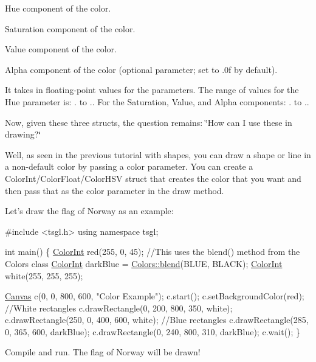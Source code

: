 \begin{DoxyItemize}
\item Hue component of the color.
\item Saturation component of the color.
\item Value component of the color.
\item Alpha component of the color (optional parameter; set to {.\-0f} by default).
\end{DoxyItemize}

It takes in floating-\/point values for the parameters. The range of values for the Hue parameter is\-: {.} to {.}. For the Saturation, Value, and Alpha components\-: {.} to {.}.

Now, given these three structs, the question remains\-: \char`\"{}\-How can I use these in drawing?\char`\"{}

Well, as seen in the previous tutorial with shapes, you can draw a shape or line in a non-\/default color by passing a color parameter. You can create a {\ttfamily Color\-Int/\-Color\-Float/\-Color\-H\-S\-V} struct that creates the color that you want and then pass that as the color parameter in the draw method.

Let's draw the flag of Norway as an example\-:


\begin{DoxyCode}
\textcolor{preprocessor}{#include <tsgl.h>}
\textcolor{keyword}{using namespace }tsgl;

\textcolor{keywordtype}{int} main() \{
  \hyperlink{structtsgl_1_1_color_int}{ColorInt} red(255, 0, 45);
  \textcolor{comment}{//This uses the blend() method from the Colors class}
  \hyperlink{structtsgl_1_1_color_int}{ColorInt} darkBlue = \hyperlink{classtsgl_1_1_colors_a26a34b86c0b70fe4984a91a24a0f263f}{Colors::blend}(BLUE, BLACK);
  \hyperlink{structtsgl_1_1_color_int}{ColorInt} white(255, 255, 255);

  \hyperlink{classtsgl_1_1_canvas}{Canvas} c(0, 0, 800, 600, \textcolor{stringliteral}{"Color Example"});
  c.start();
  c.setBackgroundColor(red);
  \textcolor{comment}{//White rectangles}
  c.drawRectangle(0, 200, 800, 350, white);
  c.drawRectangle(250, 0, 400, 600, white);
  \textcolor{comment}{//Blue rectangles}
  c.drawRectangle(285, 0, 365, 600, darkBlue);
  c.drawRectangle(0, 240, 800, 310, darkBlue);
  c.wait();
\}
\end{DoxyCode}
 Compile and run. The flag of Norway will be drawn!

